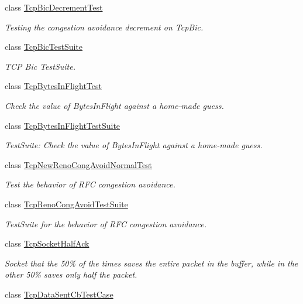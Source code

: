 \begin{DoxyCompactItemize}
class \hyperlink{classTcpBicDecrementTest}{Tcp\+Bic\+Decrement\+Test}
\begin{DoxyCompactList}\small\item\em Testing the congestion avoidance decrement on Tcp\+Bic. \end{DoxyCompactList}\item 
class \hyperlink{classTcpBicTestSuite}{Tcp\+Bic\+Test\+Suite}
\begin{DoxyCompactList}\small\item\em T\+CP Bic Test\+Suite. \end{DoxyCompactList}\item 
class \hyperlink{classTcpBytesInFlightTest}{Tcp\+Bytes\+In\+Flight\+Test}
\begin{DoxyCompactList}\small\item\em Check the value of Bytes\+In\+Flight against a home-\/made guess. \end{DoxyCompactList}\item 
class \hyperlink{classTcpBytesInFlightTestSuite}{Tcp\+Bytes\+In\+Flight\+Test\+Suite}
\begin{DoxyCompactList}\small\item\em Test\+Suite\+: Check the value of Bytes\+In\+Flight against a home-\/made guess. \end{DoxyCompactList}\item 
class \hyperlink{classTcpNewRenoCongAvoidNormalTest}{Tcp\+New\+Reno\+Cong\+Avoid\+Normal\+Test}
\begin{DoxyCompactList}\small\item\em Test the behavior of R\+FC congestion avoidance. \end{DoxyCompactList}\item 
class \hyperlink{classTcpRenoCongAvoidTestSuite}{Tcp\+Reno\+Cong\+Avoid\+Test\+Suite}
\begin{DoxyCompactList}\small\item\em Test\+Suite for the behavior of R\+FC congestion avoidance. \end{DoxyCompactList}\item 
class \hyperlink{classTcpSocketHalfAck}{Tcp\+Socket\+Half\+Ack}
\begin{DoxyCompactList}\small\item\em Socket that the 50\% of the times saves the entire packet in the buffer, while in the other 50\% saves only half the packet. \end{DoxyCompactList}\item 
class \hyperlink{classTcpDataSentCbTestCase}{Tcp\+Data\+Sent\+Cb\+Test\+Case}

\end{DoxyCompactItemize}
